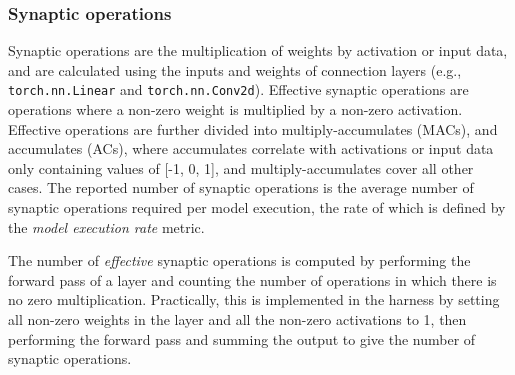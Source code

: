 \subsubsection*{Synaptic operations}
Synaptic operations are the multiplication of weights by activation or input data, and are calculated using the inputs and weights of connection layers (e.g., \texttt{torch.nn.Linear} and \texttt{torch.nn.Conv2d}).
Effective synaptic operations are operations where a non-zero weight is multiplied by a non-zero activation. 
Effective operations are further divided into multiply-accumulates (MACs), and accumulates (ACs), where accumulates correlate with activations or input data only containing values of [-1, 0, 1], and multiply-accumulates cover all other cases.
The reported number of synaptic operations is the average number of synaptic operations required per model execution, the rate of which is defined by the \textit{model execution rate} metric.



The number of \textit{effective} synaptic operations is computed by performing the forward pass of a layer and counting the number of operations in which there is no zero multiplication.
Practically, this is implemented in the harness by setting all non-zero weights in the layer and all the non-zero activations to 1, then performing the forward pass and summing the output to give the number of synaptic operations. 

